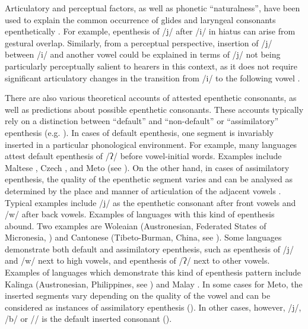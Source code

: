 \documentclass[output=paper]{langscibook}
\begin{document}
Articulatory and perceptual factors,
as well as phonetic ``naturalness'', have been 
used to explain the common occurrence of glides and laryngeal consonants epenthetically  \citep{bl08-unnatural}.
For example, epenthesis of /j/ after /i/ in hiatus
can arise from gestural overlap. 
Similarly, from a perceptual perspective,
insertion of /j/ between /i/ and  another vowel could be
explained in terms of /j/  not being particularly 
perceptually salient to hearers in this context, as it does not 
require significant articulatory changes
in the transition from /i/ to the following vowel \citep{st09,mo12}.

There are also various theoretical accounts of attested epenthetic consonants, 
as well as predictions about 
possible epenthetic consonants. These accounts typically rely on a 
distinction between ``default'' and ``non-default'' or
``assimilatory'' epenthesis (e.g. \citealt{dl06,mo12,dlki13}). 
In cases of default epenthesis, one segment is
invariably inserted in a particular phonological environment. For example,
many languages attest default epenthesis of /ʔ/ before
vowel-initial words. Examples include
Maltese \citep{mikich19},
Czech \citep{sipoch12}, and Meto (see ).
On the other hand, in cases of assimilatory epenthesis, the quality of the epenthetic segment
varies and can be analysed as determined by the place and manner of
articulation of the adjacent vowels \citep[79]{dl06}. 
Typical examples include /j/ as the epenthetic consonant
after front vowels and /w/ after back vowels. 
Examples of languages with this kind of epenthesis abound.
Two examples are Woleaian (Austronesian, Federated States of Micronesia, \citealp{so75})
and Cantonese (Tibeto-Burman, China, see \citealp{ha72}).
Some languages demonstrate both default and assimilatory epenthesis,
such as epenthesis of /j/ and /w/ next to high vowels, 
and epenthesis  of /ʔ/ next to other vowels.
Examples of languages which demonstrate
this kind of epenthesis pattern include Kalinga
(Austronesian, Philippines, see \citealt{ge70}) and Malay \citep{ah05}. 
In some cases for Meto, the inserted segments vary depending
on the quality of the vowel and can be considered as instances of
assimilatory epenthesis ().
In other cases, however, /j/, /b/ or /\gw/ is the default
inserted consonant (). 
\end{document}
